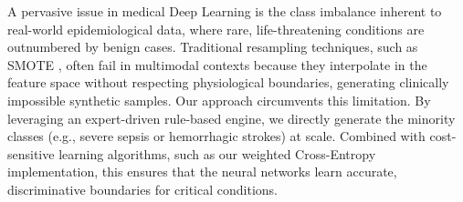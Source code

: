 A pervasive issue in medical Deep Learning is the class imbalance inherent to real-world epidemiological data, where rare, life-threatening conditions are outnumbered by benign cases. Traditional resampling techniques, such as SMOTE \cite{chawla2002}, often fail in multimodal contexts because they interpolate in the feature space without respecting physiological boundaries, generating clinically impossible synthetic samples. Our approach circumvents this limitation. By leveraging an expert-driven rule-based engine, we directly generate the minority classes (e.g., severe sepsis or hemorrhagic strokes) at scale. Combined with cost-sensitive learning algorithms, such as our weighted Cross-Entropy implementation, this ensures that the neural networks learn accurate, discriminative boundaries for critical conditions.